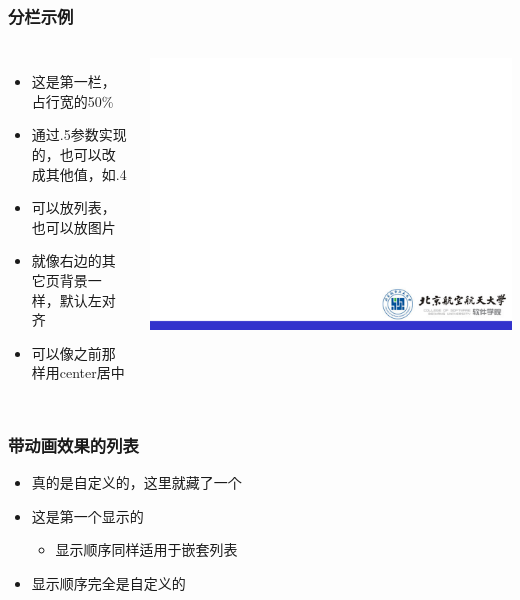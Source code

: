     \begin{frame}
        \frametitle{分栏示例}
        \begin{columns}

            \begin{itemize}
                \item 这是第一栏，占行宽的50\%
                \item 通过.5参数实现的，也可以改成其他值，如.4
                \item 可以放列表，也可以放图片
                \item 就像右边的其它页背景一样，默认左对齐
                \item 可以像之前那样用center居中
            \end{itemize}

                \includegraphics[height=0.4\textheight]{pic/bg2.png}

        \end{columns}
    \end{frame}

    \begin{frame}
        \frametitle{带动画效果的列表}
        \begin{itemize}
            \item<4-> 真的是自定义的，这里就藏了一个
            \item<1-> 这是第一个显示的
            \begin{itemize}
                \item<3-> 显示顺序同样适用于嵌套列表
            \end{itemize}
            \item<2-> 显示顺序完全是自定义的
        \end{itemize}
    \end{frame}
    
